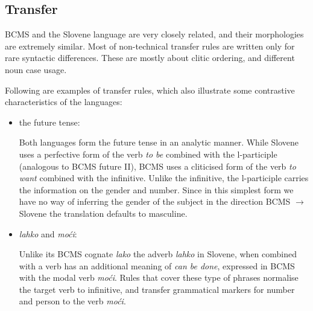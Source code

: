 
\subsection{Transfer}

BCMS and the Slovene language are very closely related, and their
morphologies are extremely similar. Most of non-technical transfer
rules are written only for rare syntactic differences. These are
mostly about clitic ordering, and different noun case usage.

Following are examples of transfer rules, which also illustrate some
contrastive characteristics of the languages:

\begin{itemize}
\item the future tense:

Both languages form the future tense in an analytic manner. While Slovene
uses a perfective form of the verb \emph{to be} combined with the l-participle (analogous
to BCMS future II), BCMS uses a cliticised form of the verb \emph{to
  want} combined with the infinitive. Unlike the infinitive, the
l-participle carries the information on the gender and number. Since
in this simplest form we have no way of inferring the gender of the
subject in the direction BCMS $\rightarrow$ Slovene the translation defaults
to masculine.

\item \emph{lahko} and \emph{moći}:

Unlike its BCMS cognate \emph{lako} the adverb \emph{lahko} in
Slovene, when combined with a verb has an additional meaning of \emph{can be
  done}, expressed in BCMS with the modal verb \emph{moći}. Rules that
cover these type of phrases normalise the target verb to infinitive,
and transfer grammatical markers for number and person to the verb \emph{moći}.


\end{itemize}
